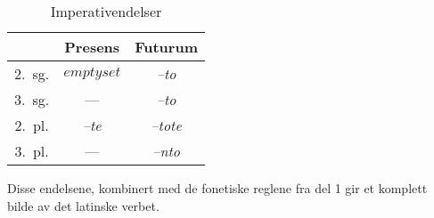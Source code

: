 \documentclass[a4paper]{article}
\begin{document}
\begin{table}[hp]
\begin{center}
\begin{tabular}{|c|c|c|}
    \hline
       & Presens & Futurum \\
    \hline
2.~sg. & $emptyset$ & \emph{--to} \\
3.~sg. & ---        & \emph{--to} \\
2.~pl. & \emph{--te} & \emph{--tote} \\
3.~pl. & ---         & \emph{--nto} \\
    \hline
\end{tabular}
\caption{Imperativendelser}
\label{imperativ}
\end{center}
\end{table}

Disse endelsene, kombinert med de fonetiske reglene fra del 1 gir et komplett
bilde av det latinske verbet.


{}
\end{document}
